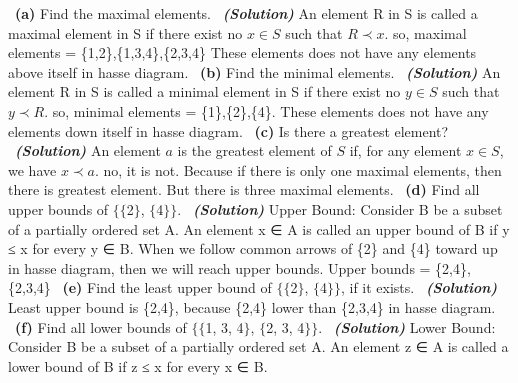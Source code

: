 \documentclass[a4 paper]{article}
\numberwithin{equation}{section}
\newcommand{\subproblem}[1]{~\newline\textbf{(#1)}}
\newcommand{\solution}{~\newline\textbf{\textit{(Solution)}} }
\newcommand{\0}{\mathbf{0}}
\begin{document}
\newpage
\subproblem{a} Find the maximal elements.
\solution
\newline
An element R in S is called a maximal element in S if there exist no $ x \in S$ such that $ R \prec x$.
\newline
so, maximal elements = \{1,2\},\{1,3,4\},\{2,3,4\}
\newline
These elements does not have any elements above itself in hasse diagram.
\newline
\subproblem{b} Find the minimal elements.
\solution
\newline
An element R in S is called a minimal element in S if there exist no $ y \in S$ such that $ y \prec R$.
\newline
so, minimal elements = \{1\},\{2\},\{4\}.
\newline
These elements does not have any elements down itself in hasse diagram.
\newline
\subproblem{c} Is there a greatest element?
\solution
\newline
An element $ a$ is the greatest element of $ S$ if, for any element $ x \in S$, we have $ x \prec a$.
\newline
no, it is not. Because if there is only one maximal elements, then there is greatest element.
\newline
But there is three maximal elements.
\newline
\subproblem{d} Find all upper bounds of $\{\{$2$\}$, $\{$4$\}\}$.
\solution
\newline
Upper Bound: Consider B be a subset of a partially ordered set A. An element x ∈ A is called \newline an upper bound of B if y ≤ x for every y ∈ B.
\newline
When we follow common arrows of \{2\} and \{4\} toward up in hasse diagram, then we will reach upper bounds.
\newline
Upper bounds = \{2,4\}, \{2,3,4\}
\newline
\subproblem{e} Find the least upper bound of $\{\{$2$\}$, $\{$4$\}\}$, if it exists.
\solution
\newline
Least upper bound is \{2,4\}, because \{2,4\} lower than \{2,3,4\} in hasse diagram.
\newline
\subproblem{f} Find all lower bounds of $\{\{$1, 3, 4$\}$, $\{$2, 3, 4$\}\}$.
\solution
\newline
Lower Bound: Consider B be a subset of a partially ordered set A. An element z ∈ A is called \newline a lower bound of B if z ≤ x for every x ∈ B.
\end{document}
